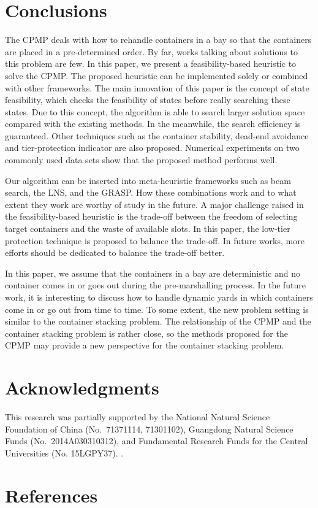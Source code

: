 \documentclass[review,3p,times,12pt,number]{elsarticle}\usepackage{amsmath}\usepackage{amssymb}
\begin{document}
\section{Conclusions}
\label{sec:conclusion}
The CPMP deals with how to rehandle containers in a bay so that the containers are placed in a pre-determined order. By far, works talking about solutions to this problem are few.
In this paper, we present a feasibility-based heuristic to solve the CPMP\@. The proposed heuristic can be implemented solely or combined with other frameworks.
The main innovation of this paper is the concept of state feasibility, which checks the feasibility of states before really searching these states.
Due to this concept, the algorithm is able to search larger solution space compared with the existing methods. In the meanwhile, the search efficiency is guaranteed. Other techniques such as the container stability, dead-end avoidance and tier-protection indicator are also proposed.
Numerical experiments on two commonly used data sets show that the proposed method performs well.

Our algorithm can be inserted into meta-heuristic frameworks such as beam search, the LNS, and the GRASP\@. How these combinations work and to what extent they work are worthy of study in the future.
A major challenge raised in the feasibility-based heuristic is the trade-off between the freedom of selecting target containers and the waste of available slots. In this paper, the low-tier protection technique is proposed to balance the trade-off. In future works, more efforts should be dedicated to balance the trade-off better.

In this paper, we assume that the containers in a bay are deterministic and no container comes in or goes out during the pre-marshalling process. In the future work, it is interesting to discuss how to handle dynamic yards in which containers come in or go out from time to time. To some extent, the new problem setting is similar to the container stacking problem. The relationship of the CPMP and the container stacking problem is rather close, so the methods proposed for the CPMP may provide a new perspective for the container stacking problem.


\section*{Acknowledgments}

This research was partially supported by the National Natural Science Foundation of China (No.\ 71371114, 71301102), Guangdong Natural Science Funds (No.\ 2014A030310312), and Fundamental Research Funds for the Central Universities (No. 15LGPY37).
.

\section*{References}



\end{document}
